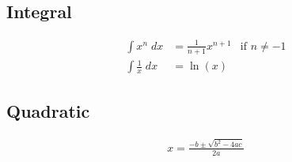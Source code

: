 \documentclass[a4paper, 12pt, addpoints]{exam}
\begin{document}
\subsection*{Integral}
\begin{align*}
	\int x^n \; dx &= \frac{1}{n+1} x^{n+1} &\text{if } n \ne -1\\
	\int \frac{1}{x} \; dx &= \ln (x)
\end{align*}

\subsection*{Quadratic}
\begin{align*}
	x = \frac{-b \pm \sqrt{b^2 - 4ac}}{2a}
\end{align*}

\pagebreak
\end{document}
